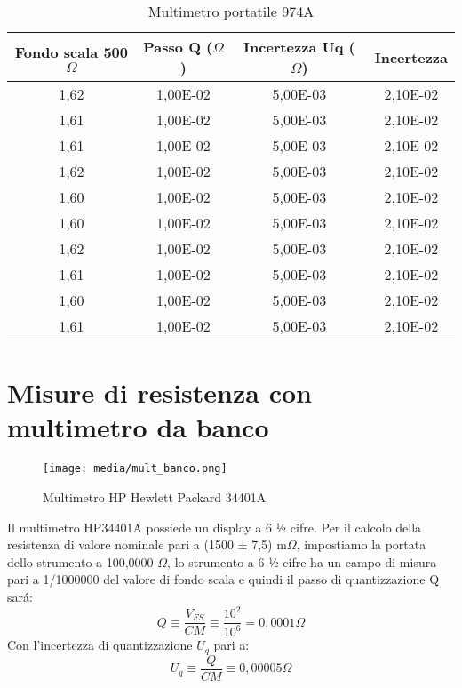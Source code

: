 \begin{table}[h]
\centering
\begin{tabular}{|c|c|c|c|}
\hline
\rowcolor[HTML]{6FA8DC} 
Fondo scala 500$\Omega$ & Passo Q ($\Omega$) & Incertezza Uq ($\Omega$) & Incertezza \\ \hline
1,62             & 1,00E-02    & 5,00E-03          & 2,10E-02   \\ \hline
1,61             & 1,00E-02    & 5,00E-03          & 2,10E-02   \\ \hline
1,61             & 1,00E-02    & 5,00E-03          & 2,10E-02   \\ \hline
1,62             & 1,00E-02    & 5,00E-03          & 2,10E-02   \\ \hline
1,60             & 1,00E-02    & 5,00E-03          & 2,10E-02   \\ \hline
1,60             & 1,00E-02    & 5,00E-03          & 2,10E-02   \\ \hline
1,62             & 1,00E-02    & 5,00E-03          & 2,10E-02   \\ \hline
1,61             & 1,00E-02    & 5,00E-03          & 2,10E-02   \\ \hline
1,60             & 1,00E-02    & 5,00E-03          & 2,10E-02   \\ \hline
1,61             & 1,00E-02    & 5,00E-03          & 2,10E-02   \\ \hline
\end{tabular}
\caption{Multimetro portatile 974A}
\label{tab:mult_port}
\end{table}


\section{Misure di resistenza con multimetro da banco}
\label{sec:mult}


\begin{figure}[h]
    \centering
    \texttt{[image: media/mult\_banco.png]}
    \caption{Multimetro HP Hewlett Packard 34401A}
    \label{fig:mult_banco}
\end{figure}


Il multimetro HP34401A possiede un display a 6 ½ cifre. 
Per il calcolo della resistenza di valore nominale pari a (1500 ± 7,5) m$\Omega$, impostiamo la portata dello strumento a 100,0000 $\Omega$, lo strumento a 6 ½ cifre ha un campo di misura 
pari a 1/1000000 del valore di fondo scala e quindi il passo di quantizzazione Q sar\'a: 
\begin{equation}
    Q \equiv \frac{V_{FS}}{CM} \equiv \frac{10^2}{10^6} = 0,0001 \Omega
\end{equation}
Con l'incertezza di quantizzazione $U_q$ pari a:
\begin{equation}
    U_q \equiv \frac{Q}{CM} \equiv 0,00005 \Omega
\end{equation}

